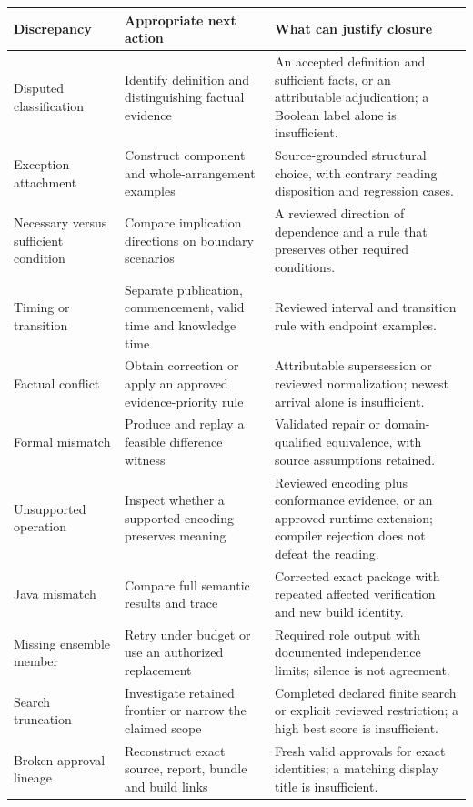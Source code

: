 \endgroup
\begin{longtable}{@{}P{27mm}P{56mm}P{65mm}@{}}

\toprule Discrepancy & Appropriate next action & What can justify closure\\\midrule\endhead
Disputed classification & Identify definition and distinguishing factual evidence & An accepted definition and sufficient facts, or an attributable adjudication; a Boolean label alone is insufficient.\\
Exception attachment & Construct component and whole-arrangement examples & Source-grounded structural choice, with contrary reading disposition and regression cases.\\
Necessary versus sufficient condition & Compare implication directions on boundary scenarios & A reviewed direction of dependence and a rule that preserves other required conditions.\\
Timing or transition & Separate publication, commencement, valid time and knowledge time & Reviewed interval and transition rule with endpoint examples.\\
Factual conflict & Obtain correction or apply an approved evidence-priority rule & Attributable supersession or reviewed normalization; newest arrival alone is insufficient.\\
Formal mismatch & Produce and replay a feasible difference witness & Validated repair or domain-qualified equivalence, with source assumptions retained.\\
Unsupported operation & Inspect whether a supported encoding preserves meaning & Reviewed encoding plus conformance evidence, or an approved runtime extension; compiler rejection does not defeat the reading.\\
Java mismatch & Compare full semantic results and trace & Corrected exact package with repeated affected verification and new build identity.\\
Missing ensemble member & Retry under budget or use an authorized replacement & Required role output with documented independence limits; silence is not agreement.\\
Search truncation & Investigate retained frontier or narrow the claimed scope & Completed declared finite search or explicit reviewed restriction; a high best score is insufficient.\\
Broken approval lineage & Reconstruct exact source, report, bundle and build links & Fresh valid approvals for exact identities; a matching display title is insufficient.\\
\bottomrule
\end{longtable}


